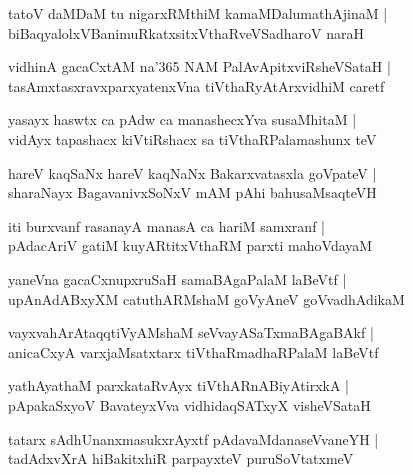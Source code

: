 \documentclass[twoside,12pt,openright]{book}
\newcounter{shloka}[chapter]
\begin{document}
\begin{shloka}%
tatoV daMDaM tu nigarxRMthiM kamaMDalumathAjinaM |\\
biBaqyalolxVBanimuRkatxsitxVthaRveVSadharoV naraH 
\end{shloka}

\begin{shloka}%
vidhinA gacaCxtAM na\char'365 NAM PalAvApitxviRsheVSataH |\\
tasAmxtasxravxparxyatenxVna tiVthaRyAtArxvidhiM caretf
\end{shloka}

\begin{shloka}%
yasayx haswtx ca pAdw ca manashecxYva susaMhitaM |\\
vidAyx tapashacx kiVtiRshacx sa tiVthaRPalamashunx teV
\end{shloka}

\begin{shloka}%
hareV kaqSaNx hareV kaqNaNx Bakarxvatasxla goVpateV |\\
sharaNayx BagavanivxSoNxV mAM pAhi bahusaMsaqteVH
\end{shloka}

\begin{shloka}%
iti burxvanf rasanayA manasA ca hariM samxranf |\\
pAdacAriV gatiM kuyARtitxVthaRM parxti mahoVdayaM 
\end{shloka}

\begin{shloka}%
yaneVna gacaCxnupxruSaH samaBAgaPalaM laBeVtf |\\
upAnAdABxyXM catuthARMshaM goVyAneV goVvadhAdikaM
\end{shloka}

\begin{shloka}%
vayxvahArAtaqqtiVyAMshaM seVvayASaTxmaBAgaBAkf |\\
anicaCxyA varxjaMsatxtarx tiVthaRmadhaRPalaM laBeVtf 
\end{shloka}

\begin{shloka}%
yathAyathaM parxkataRvAyx tiVthARnABiyAtirxkA |\\
pApakaSxyoV BavateyxVva vidhidaqSATxyX visheVSataH 
\end{shloka}

\begin{shloka}%
tatarx sAdhUnanxmasukxrAyxtf pAdavaMdanaseVvaneYH |\\
tadAdxvXrA hiBakitxhiR parpayxteV puruSoVtatxmeV
\end{shloka}
\end{document}

